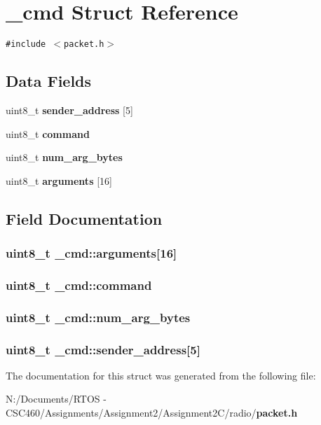 \section{\_\-cmd Struct Reference}
\label{struct__cmd}
{\tt \#include $<$packet.h$>$}

\subsection*{Data Fields}
\begin{CompactItemize}
\item 
uint8\_\-t {\bf sender\_\-address} [5]
\item 
uint8\_\-t {\bf command}
\item 
uint8\_\-t {\bf num\_\-arg\_\-bytes}
\item 
uint8\_\-t {\bf arguments} [16]
\end{CompactItemize}


\subsection{Field Documentation}
\subsubsection{\setlength{\rightskip}{0pt plus 5cm}uint8\_\-t {\bf \_\-cmd::arguments}[16]}\label{struct__cmd_ddebaffe57d014bb9fcb7e3ea78c170a}


\subsubsection{\setlength{\rightskip}{0pt plus 5cm}uint8\_\-t {\bf \_\-cmd::command}}\label{struct__cmd_c46a3bf5886c50c0a36bf76cc18e4439}


\subsubsection{\setlength{\rightskip}{0pt plus 5cm}uint8\_\-t {\bf \_\-cmd::num\_\-arg\_\-bytes}}\label{struct__cmd_b4b1ceba14132cb53afd17648791b5ca}


\subsubsection{\setlength{\rightskip}{0pt plus 5cm}uint8\_\-t {\bf \_\-cmd::sender\_\-address}[5]}\label{struct__cmd_bd8db9167e18bc9979f09c1feda40d2d}




The documentation for this struct was generated from the following file:\begin{CompactItemize}
\item 
N:/Documents/RTOS - CSC460/Assignments/Assignment2/Assignment2C/radio/{\bf packet.h}\end{CompactItemize}
